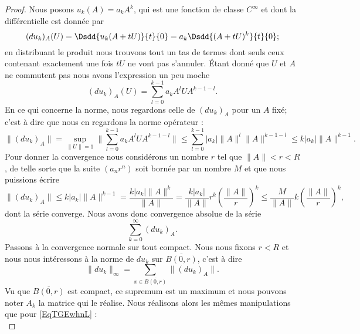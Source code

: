 \begin{proof}
    Nous posons \( u_k(A)=a_kA^k\), qui est une fonction de classe \(  C^{\infty}\) et dont la différentielle est donnée par
    \begin{equation}
        (du_k)_A(U)=\Dsdd{ u_k(A+tU) }{t}{0}=a_k\Dsdd{ (A+tU)^k }{t}{0};
    \end{equation}
    en distribuant le produit nous trouvons tout un tas de termes dont seuls ceux contenant exactement une fois \( tU\) ne vont pas s'annuler. Étant donné que \( U\) et \( A\) ne commutent pas nous avons l'expression un peu moche
    \begin{equation}
        (du_k)_A(U)=\sum_{l=0}^{k-1}a_kA^lUA^{k-1-l}.
    \end{equation}
    En ce qui concerne la norme, nous regardons celle de \( (du_k)_A\) pour un \( A\) fixé; c'est à dire que nous en regardons la norme opérateur :
    \begin{equation}
        \| (du_k)_A \|=\sup_{\| U \|=1}\| \sum_{l=0}^{k-1}a_kA^lUA^{k-1-l} \|\leq \sum_{l=0}^{k-1}| a_k |\| A \|^{l}\| A \|^{k-1-l}\leq k| a_k |\| A \|^{k-1}.
    \end{equation}
    Pour donner la convergence nous considérons un nombre \( r\) tel que \( \| A \|<r<R\), de telle sorte que la suite \( (a_nr^n)\) soit bornée par un nombre \( M\) et que nous puissions écrire
    \begin{equation}    \label{EqTGEwhnL}
        \| (du_k)_A \|\leq k| a_k |\| A \|^{k-1}=\frac{ k| a_k |\| A \|^k }{ \| A \| }=\frac{ k| a_k | }{ \| A \| }r^k\left( \frac{ \| A \| }{ r } \right)^k\leq \frac{ M }{ \| A \| }k\left( \frac{ \| A \| }{ r } \right)^k,
    \end{equation}
    dont la série converge. Nous avons donc convergence absolue de la série
    \begin{equation}
        \sum_{k=0}^{\infty}(du_k)_A.
    \end{equation}
    Passons à la convergence normale sur tout compact. Nous nous fixons \( r<R\) et nous nous intéressons à la norme de \( du_k\) sur \( \overline{ B(0,r) }\), c'est à dire
    \begin{equation}
        \| du_k \|_{\infty}=\sum_{x\in\overline{ B(0,r) }}\| (du_k)_A \|.
    \end{equation}
    Vu que \( \overline{ B(0,r) }\) est compact, ce supremum est un maximum et nous pouvons noter \( A_k\) la matrice qui le réalise. Nous réalisons alors les mêmes manipulations que pour \eqref{EqTGEwhnL} :
    \begin{equation}

\end{equation}
\end{proof}
